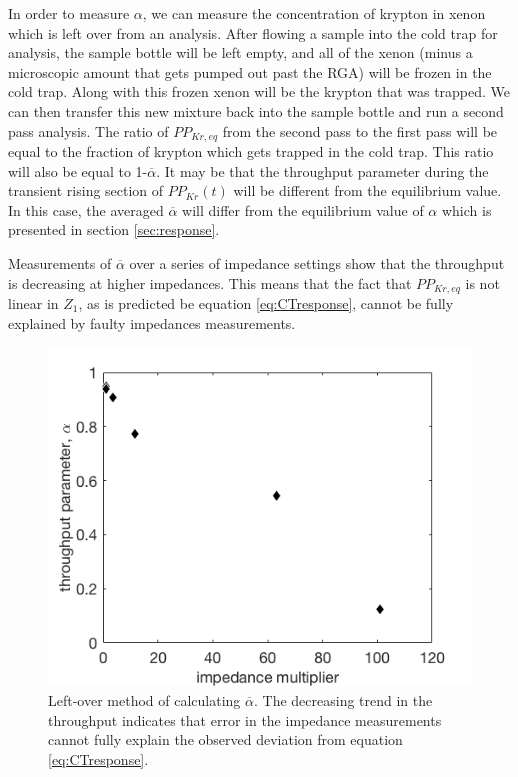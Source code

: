 In order to measure $\alpha$, we can measure the concentration of krypton in xenon which is left over from an analysis. After flowing a sample into the cold trap for analysis, the sample bottle will be left empty, and all of the xenon (minus a microscopic amount that gets pumped out past the RGA) will be frozen in the cold trap. Along with this frozen xenon will be the krypton that was trapped. We can then transfer this new mixture back into the sample bottle and run a second pass analysis. The ratio of $PP_{Kr,eq}$  from the second pass to the first pass will be equal to the fraction of krypton which gets trapped in the cold trap. This ratio will also be equal to 1-$\overline{\alpha}$. It may be that the throughput parameter during the transient rising section of $PP_{Kr}(t)$ will be different from the equilibrium value. In this case, the averaged $\overline{\alpha}$ will differ from the equilibrium value of $\alpha$ which is presented in section \ref{sec:response}. 

Measurements of $\overline{\alpha}$ over a series of impedance settings show that the throughput is decreasing at higher impedances. This means that the fact that $PP_{Kr,eq}$ is not linear in $Z_1$, as is predicted be equation \ref{eq:CTresponse}, cannot be fully explained by faulty impedances measurements.
\begin{figure}[h!]
\centering
\includegraphics[width=\textwidth]{Figures/SLAC_alpha.png}
\caption{Left-over method of calculating $\overline{\alpha}$. The decreasing trend in the throughput indicates that error in the impedance measurements cannot fully explain the observed deviation from equation \ref{eq:CTresponse}. }
\label{fig:alpha}
\end{figure}

